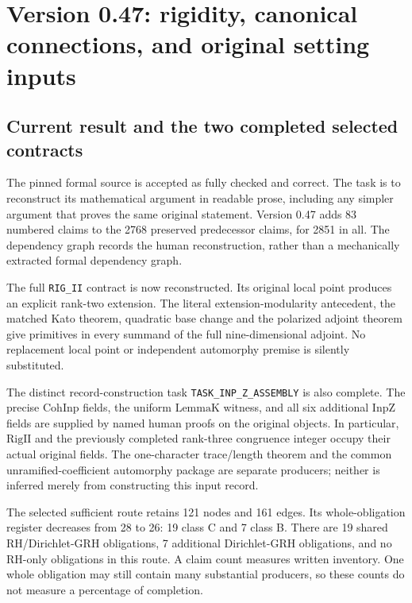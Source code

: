 \section{Version 0.47: rigidity, canonical connections, and original setting inputs}
\label{sec:dependency-audit-v47}

\subsection{Current result and the two completed selected contracts}

The pinned formal source is accepted as fully checked and correct.
The task is to reconstruct its mathematical argument in readable prose,
including any simpler argument that proves the same original statement.
Version 0.47 adds 83 numbered claims to the 2768 preserved predecessor
claims, for 2851 in all. The dependency graph records the human
reconstruction, rather than a mechanically extracted formal dependency
graph.

The full \texttt{RIG\_\allowbreak II} contract is now reconstructed. Its original
local point produces an explicit rank-two extension. The literal
extension-modularity antecedent, the matched Kato theorem, quadratic
base change and the polarized adjoint theorem give primitives in every
summand of the full nine-dimensional adjoint. No replacement local
point or independent automorphy premise is silently substituted.

The distinct record-construction task
\texttt{TASK\_\allowbreak INP\_\allowbreak Z\_\allowbreak ASSEMBLY} is also complete. The precise
\(\mathrm{CohInp}\) fields, the uniform \(\mathrm{LemmaK}\)
witness, and all six additional \(\mathrm{InpZ}\) fields are supplied
by named human proofs on the original objects. In particular,
\(\mathrm{RigII}\) and the previously completed rank-three
congruence integer occupy their actual original fields.
The one-character trace/length theorem and the common
unramified-coefficient automorphy package are separate producers;
neither is inferred merely from constructing this input record.

The selected sufficient route retains 121 nodes and 161 edges.
Its whole-obligation register decreases from 28 to 26:
19 class C and 7 class B. There are 19 shared RH/Dirichlet-GRH
obligations, 7 additional Dirichlet-GRH obligations, and no
RH-only obligations in this route. A claim count measures written
inventory. One whole obligation may still contain many substantial
producers, so these counts do not measure a percentage of completion.

